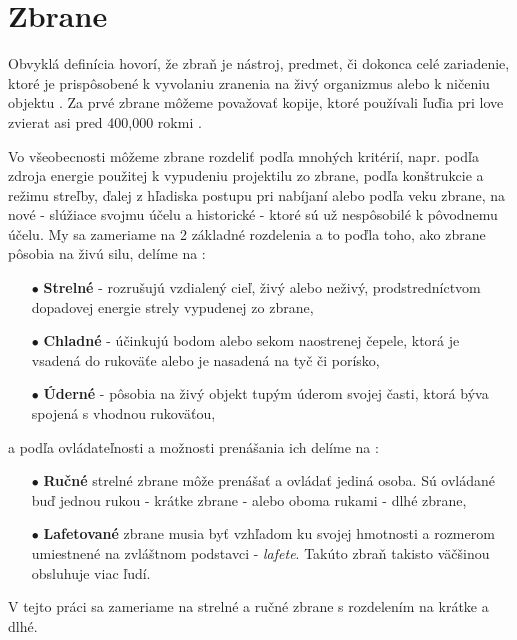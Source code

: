 
\section{Zbrane}
\label{sec:weapons}
Obvyklá definícia hovorí, že zbraň je nástroj, predmet, či dokonca celé zariadenie,
ktoré je prispôsobené k vyvolaniu zranenia na živý organizmus alebo k ničeniu objektu \cite{book:StrelneZbrane}.
Za prvé zbrane môžeme považovať kopije, ktoré používali ľuďia pri love zvierat asi pred 400,000 rokmi \cite{prop:SpearHistory}.

Vo všeobecnosti môžeme zbrane rozdeliť podľa mnohých kritérií, napr. podľa zdroja energie použitej k vypudeniu projektilu zo zbrane,
podľa konštrukcie a režimu streľby, ďalej z hľadiska postupu pri nabíjaní alebo podľa veku zbrane, na nové - slúžiace svojmu účelu a historické - ktoré sú už nespôsobilé k pôvodnemu účelu.
My sa zameriame na 2 základné rozdelenia a to poďla toho, ako zbrane pôsobia na živú silu, delíme na \cite{book:StrelneZbrane}:
\begin{enumerate}
	\item[$\bullet$] \textbf{Strelné} - rozrušujú vzdialený cieľ, živý alebo neživý, prodstredníctvom dopadovej energie strely vypudenej zo zbrane,
	\item[$\bullet$] \textbf{Chladné} - účinkujú bodom alebo sekom naostrenej čepele, ktorá je vsadená do rukoväťe alebo je nasadená na tyč či porísko,
    \item[$\bullet$] \textbf{Úderné} - pôsobia na živý objekt tupým úderom svojej časti, ktorá býva spojená s vhodnou rukoväťou,
\end{enumerate}
a podľa ovládateľnosti a možnosti prenášania ich delíme na \cite{book:StrelneZbrane}:
\begin{enumerate}
	\item[$\bullet$] \textbf{Ručné} strelné zbrane môže prenášať a ovládať jediná osoba. Sú ovládané buď jednou rukou - krátke zbrane - alebo oboma rukami - dlhé zbrane,
	\item[$\bullet$] \textbf{Lafetované} zbrane musia byť vzhľadom ku svojej hmotnosti a rozmerom umiestnené na zvláštnom podstavci - \textit{lafete}. Takúto zbraň takisto väčšinou obsluhuje viac ľudí.
\end{enumerate}
V tejto práci sa zameriame na strelné a ručné zbrane s rozdelením na krátke a dlhé.

